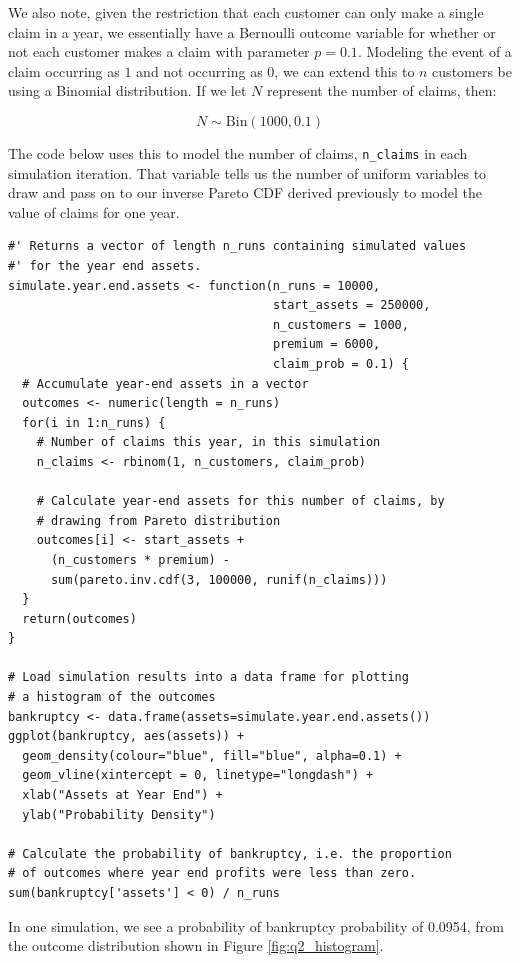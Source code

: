 \documentclass{article}
\begin{document}
We also note, given the restriction that each customer can only make a
single claim in a year, we essentially have a Bernoulli outcome variable
for whether or not each customer makes a claim with parameter $p =
0.1$. Modeling the event of a claim occurring as $1$ and not occurring
as $0$, we can extend this to $n$ customers be using a Binomial
distribution. If we let $N$ represent the number of claims, then:

\[
  N \sim \mathrm{Bin}(1000, 0.1)
\]

The code below uses this to model the number of claims,
\texttt{n\_claims} in each simulation iteration. That variable tells us
the number of uniform variables to draw and pass on to our inverse
Pareto CDF derived previously to model the value of claims for one year.

\begin{verbatim}
#' Returns a vector of length n_runs containing simulated values
#' for the year end assets.
simulate.year.end.assets <- function(n_runs = 10000,
                                     start_assets = 250000,
                                     n_customers = 1000,
                                     premium = 6000,
                                     claim_prob = 0.1) {
  # Accumulate year-end assets in a vector
  outcomes <- numeric(length = n_runs)
  for(i in 1:n_runs) {
    # Number of claims this year, in this simulation
    n_claims <- rbinom(1, n_customers, claim_prob)

    # Calculate year-end assets for this number of claims, by
    # drawing from Pareto distribution
    outcomes[i] <- start_assets +
      (n_customers * premium) -
      sum(pareto.inv.cdf(3, 100000, runif(n_claims)))
  }
  return(outcomes)
}

# Load simulation results into a data frame for plotting
# a histogram of the outcomes
bankruptcy <- data.frame(assets=simulate.year.end.assets())
ggplot(bankruptcy, aes(assets)) +
  geom_density(colour="blue", fill="blue", alpha=0.1) +
  geom_vline(xintercept = 0, linetype="longdash") +
  xlab("Assets at Year End") +
  ylab("Probability Density")

# Calculate the probability of bankruptcy, i.e. the proportion
# of outcomes where year end profits were less than zero.
sum(bankruptcy['assets'] < 0) / n_runs
\end{verbatim}

In one simulation, we see a probability of bankruptcy probability of
0.0954, from the outcome distribution shown in Figure
\ref{fig:q2_histogram}.
\end{document}
